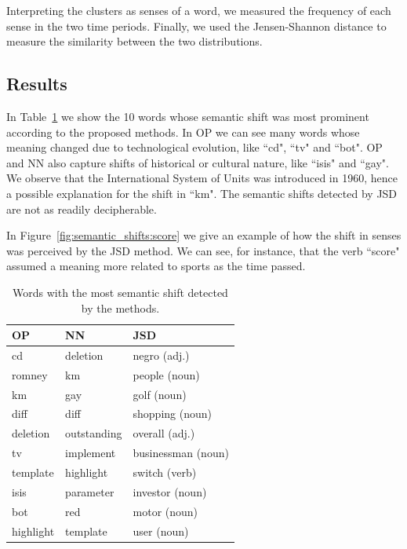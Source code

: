 \documentclass[runningheads]{llncs}
\begin{document}
Interpreting the clusters as senses of a word, we measured the frequency of each sense in the two time periods. Finally, we used the Jensen-Shannon distance to measure the similarity between the two distributions.

\subsection{Results}
\label{subsec:semantic_shifts:results}

In Table~\ref{tab:semantic_shifts:top_words} we show the 10 words whose semantic shift was most prominent according to the proposed methods. In OP we can see many words whose meaning changed due to technological evolution, like “cd", “tv" and “bot". OP and NN also capture shifts of historical or cultural nature, like “isis" and “gay". We observe that the International System of Units was introduced in 1960, hence a possible explanation for the shift in “km". The semantic shifts detected by JSD are not as readily decipherable. 

In Figure~\ref{fig:semantic_shifts:score} we give an example of how the shift in senses was perceived by the JSD method. We can see, for instance, that the verb “score" assumed a meaning more related to sports as the time passed.

\begin{table}
    \caption{Words with the most semantic shift detected by the methods.}
    \label{tab:semantic_shifts:top_words}
    \centering
    \begin{tabular}{lll}
        \toprule
        OP & NN & JSD \\
        \midrule
        cd & deletion & negro (adj.) \\
        romney & km & people (noun) \\
        km & gay & golf (noun) \\
        diff & diff & shopping (noun)  \\
        deletion & outstanding & overall (adj.) \\
        tv & implement & businessman (noun) \\
        template & highlight & switch (verb) \\
        isis & parameter & investor (noun) \\
        bot & red & motor (noun) \\
        highlight & template & user (noun) \\
        \bottomrule
    \end{tabular}
\end{table}
\end{document}
